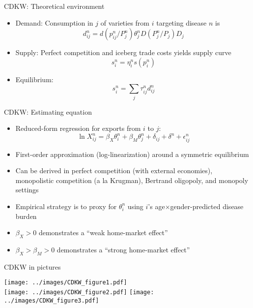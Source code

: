 \documentclass[10pt,notes=hide]{beamer}
\begin{document}
\begin{frame}{CDKW: Theoretical environment}
\begin{itemize}
	\item Demand: Consumption in $j$ of varieties from $i$ targeting disease $n$ is
	\begin{equation*}d_{ij}^n = d(p_{ij}^n/P_j^n) \theta_j^n D(P_j^n/P_j) D_j \end{equation*}
	\item Supply: Perfect competition and iceberg trade costs yields supply curve
	\begin{equation*} s_i^n = \eta_i^n s(p_i^n)\end{equation*}
	\item Equilibrium: 
	\begin{equation*} s_i^n = \sum_j \tau_{ij}^n d_{ij}^n \end{equation*}
\end{itemize}
\end{frame}
\begin{frame}{CDKW: Estimating equation}
\begin{itemize}
	\item Reduced-form regression for exports from $i$ to $j$:
	\begin{equation*}
		\ln X_{ij}^n = \beta_X \theta_i^n + \beta_M \theta_j^n +  \delta_{ij} + \delta^n + \epsilon_{ij}^n
	\end{equation*}
 	\item First-order approximation (log-linearization) around a symmetric equilibrium
 	\item Can be derived in perfect competition (with external economies), monopolistic competition (a la Krugman), Bertrand oligopoly, and monopoly settings
 	\item Empirical strategy is to proxy for $\theta_i^n$ using $i$'s age$\times$gender-predicted disease burden
 	\item $\beta_X > 0$ demonstrates a ``weak home-market effect''
 	\item $\beta_X > \beta_M > 0$ demonstrates a ``strong home-market effect''
\end{itemize}
\end{frame}
\begin{frame}{CDKW in pictures}
\begin{center}
\texttt{[image: ../images/CDKW\_figure1.pdf]}\\
\texttt{[image: ../images/CDKW\_figure2.pdf]}
\texttt{[image: ../images/CDKW\_figure3.pdf]}
\end{center}
\end{frame}
\end{document}
